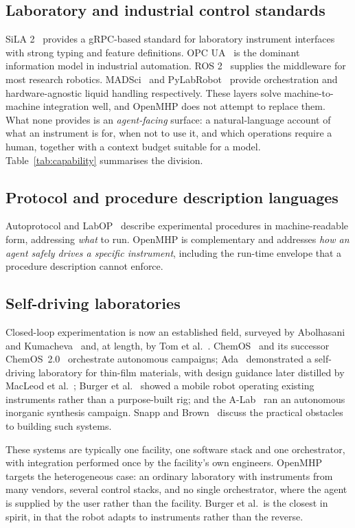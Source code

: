 \documentclass[11pt]{article}
\begin{document}
\subsection{Laboratory and industrial control standards}
SiLA 2~\cite{sila2} provides a gRPC-based standard for laboratory instrument interfaces
with strong typing and feature definitions. OPC UA~\cite{opcua} is the dominant information
model in industrial automation. ROS 2~\cite{macenski2022} supplies the middleware for most
research robotics. MADSci~\cite{madsci,vescovi2023} and PyLabRobot~\cite{wierenga2023} provide
orchestration and hardware-agnostic liquid handling respectively. These layers solve
machine-to-machine integration well, and OpenMHP does not attempt to replace them. What
none provides is an \emph{agent-facing} surface: a natural-language account of what an
instrument is for, when not to use it, and which operations require a human, together with
a context budget suitable for a model. Table~\ref{tab:capability} summarises the division.

\subsection{Protocol and procedure description languages}
Autoprotocol and LabOP~\cite{labop} describe experimental procedures in machine-readable
form, addressing \emph{what} to run. OpenMHP is complementary and addresses \emph{how an
agent safely drives a specific instrument}, including the run-time envelope that a
procedure description cannot enforce.

\subsection{Self-driving laboratories}
Closed-loop experimentation is now an established field, surveyed by
Abolhasani and Kumacheva~\cite{abolhasani2023} and, at length, by Tom et
al.~\cite{tom2024}. ChemOS~\cite{roch2018} and its successor
ChemOS~2.0~\cite{sim2024} orchestrate autonomous campaigns; Ada~\cite{macleod2020}
demonstrated a self-driving laboratory for thin-film materials, with design guidance
later distilled by MacLeod et al.~\cite{macleod2023}; Burger et al.~\cite{burger2020}
showed a mobile robot operating existing instruments rather than a purpose-built rig;
and the A-Lab~\cite{szymanski2023} ran an autonomous inorganic synthesis campaign.
Snapp and Brown~\cite{snapp2023} discuss the practical obstacles to building such systems.

These systems are typically one facility, one software stack and one orchestrator, with
integration performed once by the facility's own engineers. OpenMHP targets the
heterogeneous case: an ordinary laboratory with instruments from many vendors, several
control stacks, and no single orchestrator, where the agent is supplied by the user rather
than the facility. Burger et al.\ is the closest in spirit, in that the robot adapts to
instruments rather than the reverse.
\end{document}
